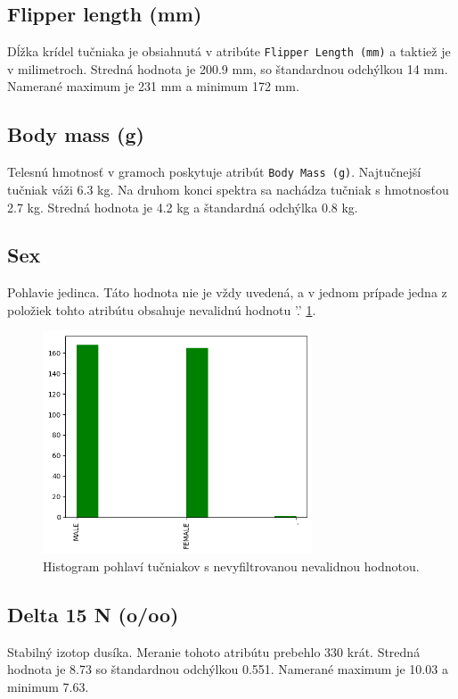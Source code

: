 \documentclass[10pt,xcolor=pdflatex,dvipsnames,table,oneside]{book}
\begin{document}
\subsection*{Flipper length (mm)}
Dĺžka krídel tučniaka je obsiahnutá v atribúte \texttt{Flipper Length (mm)} a taktiež je v milimetroch. Stredná hodnota je 200.9 mm, so štandardnou odchýlkou 14 mm. Namerané maximum je 231 mm a minimum 172 mm.


\subsection*{Body mass (g)}
Telesnú hmotnosť v gramoch poskytuje atribút \texttt{Body Mass (g)}. Najtučnejší tučniak váži 6.3 kg. Na druhom konci spektra sa nachádza tučniak s hmotnosťou 2.7 kg. Stredná hodnota je 4.2 kg a štandardná odchýlka 0.8 kg.


\subsection*{Sex}
Pohlavie jedinca. Táto hodnota nie je vždy uvedená, a v jednom prípade jedna z položiek tohto atribútu obsahuje nevalidnú hodnotu '.' \ref{fig:the_thing}.

\begin{figure}[t]
  \includegraphics[width=8cm]{img/the_thing.png}
  \centering
  \caption{Histogram pohlaví tučniakov s nevyfiltrovanou nevalidnou hodnotou.}
  \label{fig:the_thing}
\end{figure}


\subsection*{Delta 15 N (o/oo)}
Stabilný izotop dusíka. Meranie tohoto atribútu prebehlo 330 krát. Stredná hodnota je 8.73 so štandardnou odchýlkou 0.551. Namerané maximum je 10.03 a minimum 7.63.
\end{document}

